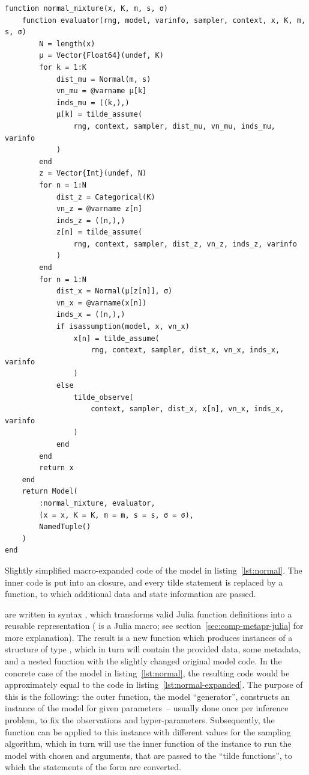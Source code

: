 \begin{lstfloat}
  \begin{lstlisting}[style=lstfloat]
function normal_mixture(x, K, m, s, σ)
    function evaluator(rng, model, varinfo, sampler, context, x, K, m, s, σ)
        N = length(x)
        μ = Vector{Float64}(undef, K)
        for k = 1:K
            dist_mu = Normal(m, s)
            vn_mu = @varname μ[k]
            inds_mu = ((k,),)
            μ[k] = tilde_assume(
                rng, context, sampler, dist_mu, vn_mu, inds_mu, varinfo
            )
        end
        z = Vector{Int}(undef, N)
        for n = 1:N
            dist_z = Categorical(K)
            vn_z = @varname z[n]
            inds_z = ((n,),)
            z[n] = tilde_assume(
                rng, context, sampler, dist_z, vn_z, inds_z, varinfo
            )
        end
        for n = 1:N
            dist_x = Normal(μ[z[n]], σ)
            vn_x = @varname(x[n])
            inds_x = ((n,),)
            if isassumption(model, x, vn_x)
                x[n] = tilde_assume(
                    rng, context, sampler, dist_x, vn_x, inds_x, varinfo
                )
            else
                tilde_observe(
                    context, sampler, dist_x, x[n], vn_x, inds_x, varinfo
                )
            end
        end
        return x
    end
    return Model(
        :normal_mixture, evaluator, 
        (x = x, K = K, m = m, s = s, σ = σ), 
        NamedTuple()
    )
end
\end{lstlisting}
  \caption{Slightly simplified macro-expanded code of the model in listing~\ref{lst:normal}.  The
    inner code is put into an \protect{} closure, and every tilde statement is
    replaced by a \protect{} function, to which additional data and state information
    are passed.\label{lst:normal-expanded}}
\end{lstfloat}
\setlength{\parskip}{0pt}

 are written in \dppljl{} syntax \parencite{tarek2020dynamicppl},
which transforms valid Julia function definitions into a reusable representation ( is
a Julia macro; see section~\ref{sec:comp-metapr-julia} for more explanation).  The result is a new
function which produces instances of a structure of type , which in turn will contain
the provided data, some metadata, and a nested function with the slightly changed original model
code.  In the concrete case of the model in listing~\ref{lst:normal}, the resulting code would be
approximately equal to the code in listing~\ref{lst:normal-expanded}.  The purpose of this is the
following: the outer function, the model \enquote{generator}, constructs an instance of the model
for given parameters~-- usually done once per inference problem, to fix the observations and
hyper-parameters.  Subsequently, the  function can be applied to this instance with
different values for the sampling algorithm, which in turn will use the inner 
function of the instance to run the model with chosen  and  arguments,
that are passed to the \enquote{tilde functions}, to which the statements of the form  are converted.

